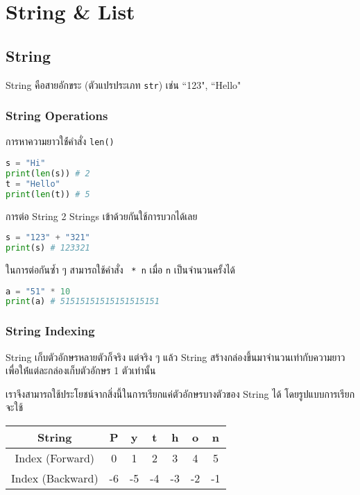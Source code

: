 \section{String \& List}

\subsection{String}

String คือสายอักขระ (ตัวแปรประเภท \verb|str|) เช่น ``123", ``Hello"

\subsubsection{String Operations}

การหาความยาวใช้่คำสั่ง \verb|len()|

\begin{lstlisting}[language=Python]
s = "Hi"
print(len(s)) # 2
t = "Hello"
print(len(t)) # 5
\end{lstlisting}

การต่อ String 2 Strings เข้าด้วยกันใช้การบวกได้เลย

\begin{lstlisting}[language=Python]
s = "123" + "321"
print(s) # 123321
\end{lstlisting}

ในการต่อกันซ้ำ ๆ สามารถใช้คำสั่ง \verb | * n| เมื่อ \verb|n| เป็นจำนวนครั้งได้

\begin{lstlisting}[language=Python]
a = "51" * 10
print(a) # 51515151515151515151
\end{lstlisting}

\subsubsection{String Indexing}

String เก็บตัวอักษรหลายตัวก็จริง แต่จริง ๆ แล้ว String สร้างกล่องขึ้นมาจำนวนเท่ากับความยาวเพื่อให้่แต่ละกล่องเก็บตัวอักษร 1 ตัวเท่านั้น

เราจึงสามารถใช้ประโยชน์จากสิ่งนี้ในการเรียกแค่ตัวอักษรบางตัวของ String ได้ โดยรูปแบบการเรียกจะใช้

\begin{center}
    \begin{tabular}{|c|c|c|c|c|c|c|}
         \hline
         String & P & y & t & h & o & n\\
         \hline
         Index (Forward) & 0 & 1 & 2 & 3 & 4 & 5\\
         \hline
         Index (Backward) & -6 & -5 & -4 & -3 & -2 & -1\\
         \hline
    \end{tabular}
\end{center}

